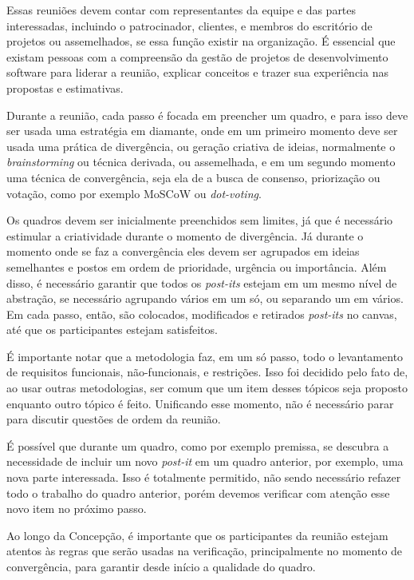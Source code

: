 \documentclass[a4]{report}
\begin{document}
Essas reuniões devem contar com representantes da equipe e das partes interessadas, incluindo o patrocinador, clientes, e membros do escritório de projetos ou assemelhados, se essa função existir na organização. É essencial que existam pessoas com a compreensão da gestão de projetos de desenvolvimento software para liderar a reunião, explicar conceitos e trazer sua experiência nas propostas e estimativas.

Durante a reunião, cada passo é focada em preencher um quadro, e para isso deve ser usada uma estratégia em diamante, onde em um primeiro momento deve ser usada uma prática de divergência, ou geração criativa de ideias, normalmente o \textit{brainstorming}\citep{tracy:2015} ou técnica derivada, ou assemelhada, e em um segundo momento uma técnica de convergência,  seja ela de a busca de consenso, priorização ou votação, como por exemplo MoSCoW\citep{dsdm:2nd} ou \textit{dot-voting}\citep{gray:2010}.

Os quadros devem ser inicialmente preenchidos sem limites, já que é necessário estimular a criatividade durante o momento de divergência. Já durante o momento onde se faz a convergência eles devem ser agrupados em ideias semelhantes e postos em ordem de prioridade, urgência ou importância. Além disso, é necessário garantir que todos os \textit{post-its} estejam em um mesmo nível de abstração, se necessário agrupando vários em um só, ou separando um em vários.
Em cada passo, então, são colocados, modificados e retirados \textit{post-its} no canvas, até que os participantes estejam satisfeitos.

É importante notar que a metodologia faz, em um só passo, todo o levantamento de requisitos funcionais, não-funcionais, e restrições. Isso foi decidido pelo fato de, ao usar outras metodologias, ser comum que um item desses tópicos seja proposto enquanto outro tópico é feito. Unificando esse momento, não é necessário parar para discutir questões de ordem da reunião.

É possível que durante um quadro, como por exemplo premissa, se descubra a necessidade de incluir um novo \textit{post-it} em um quadro anterior, por exemplo, uma nova parte interessada. Isso é totalmente permitido, não sendo necessário refazer todo o trabalho do quadro anterior, porém devemos verificar com atenção esse novo item no próximo passo.

Ao longo da Concepção, é importante que os participantes da reunião estejam atentos às regras que serão usadas na verificação, principalmente no momento de convergência, para garantir desde início a qualidade do quadro.
\end{document}
